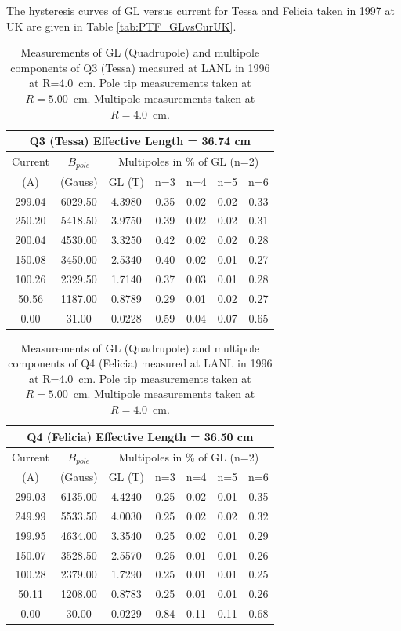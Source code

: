 \documentclass[12pt]{article}
\begin{document}
The hysteresis curves of GL versus current for Tessa and Felicia taken in 1997 at UK are given in Table \ref{tab:PTF_GLvsCurUK}.

\begin{table}[!h]
\begin{center}
\caption{\label{tab:Tessa_multipole}Measurements of GL (Quadrupole) and multipole components of Q3 (Tessa) measured at LANL in 1996 at R=4.0~cm. Pole tip measurements taken at $R=5.00$~cm. Multipole measurements taken at $R=4.0$~cm.}
\begin{tabular}{|c|c|c|c|c|c|c|}
\hline
\multicolumn{7}{|c|}{Q3 (Tessa) Effective Length = 36.74 cm}	\\ \hline					
Current&	$B_{pole}$&\multicolumn{5}{|c|}{Multipoles in \% of GL (n=2) }\\ 			
(A)     	&(Gauss)	&GL (T)    &n=3        &n=4        &n=5         &n=6\\\hline
299.04	&6029.50	&4.3980	&0.35	&0.02	&0.02	&0.33\\
250.20	&5418.50	&3.9750	&0.39	&0.02	&0.02	&0.31\\
200.04	&4530.00	&3.3250	&0.42	&0.02	&0.02	&0.28\\
150.08	&3450.00	&2.5340	&0.40	&0.02	&0.01	&0.27\\
100.26	&2329.50	&1.7140	&0.37	&0.03	&0.01	&0.28\\
50.56	&1187.00	&0.8789	&0.29	&0.01	&0.02	&0.27\\
0.00		&31.00	&0.0228	&0.59	&0.04	&0.07	&0.65\\\hline
\end{tabular}
\end{center}
\end{table}
\begin{table}[!h]
\begin{center}
\caption{\label{tab:Felicia_multipole}Measurements of GL (Quadrupole) and multipole components of Q4 (Felicia) measured at LANL in 1996 at R=4.0~cm. Pole tip measurements taken at $R=5.00$~cm. Multipole measurements taken at $R=4.0$~cm.}
\begin{tabular}{|c|c|c|c|c|c|c|}
\hline
\multicolumn{7}{|c|}{Q4 (Felicia) Effective Length = 36.50 cm}	\\ \hline					
Current&	$B_{pole}$&\multicolumn{5}{|c|}{Multipoles in \% of GL (n=2) }\\ 			
(A)     	&(Gauss)	&GL (T)    &n=3        &n=4        &n=5         &n=6\\\hline
299.03	&6135.00	&4.4240	&0.25	&0.02	&0.01	&0.35\\
249.99	&5533.50	&4.0030	&0.25	&0.02	&0.02	&0.32\\
199.95	&4634.00	&3.3540	&0.25	&0.02	&0.01	&0.29\\
150.07	&3528.50	&2.5570	&0.25	&0.01	&0.01	&0.26\\
100.28	&2379.00	&1.7290	&0.25	&0.01	&0.01	&0.25\\
50.11	&1208.00	&0.8783	&0.25	&0.01	&0.01	&0.26\\
0.00		&30.00	&0.0229	&0.84	&0.11	&0.11	&0.68\\
\hline
\end{tabular}
\end{center}
\end{table}
\end{document}
